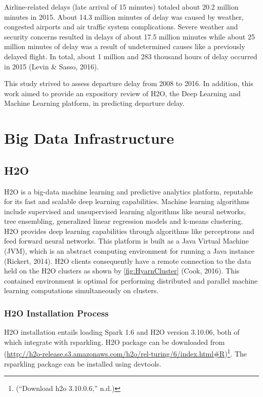 \documentclass[12pt,twoside]{amherstthesis}
\begin{document}
  Airline-related delays (late arrival of 15 minutes) totaled about 20.2
  million minutes in 2015. About 14.3 million minutes of delay was caused
  by weather, congested airports and air traffic system complications.
  Severe weather and security concerns resulted in delays of about 17.5
  million minutes while about 25 million minutes of delay was a result of
  undetermined causes like a previously delayed flight. In total, about 1
  million and 283 thousand hours of delay occurred in 2015 (Levin \&
  Sasso, 2016).
  
  This study strived to assess departure delay from 2008 to 2016. In
  addition, this work aimed to provide an expository review of H2O, the
  Deep Learning and Machine Learning platform, in predicting departure
  delay.
  
  \chapter{Big Data Infrastructure}\label{big-data-infrastructure}
  
  \section{H2O}\label{h2o}
  
  H2O is a big-data machine learning and predictive analytics platform,
  reputable for its fast and scalable deep learning capabilities. Machine
  learning algorithms include supervised and unsupervised learning
  algorithms like neural networks, tree ensembling, generalized linear
  regression models and k-means clustering. H2O provides deep learning
  capabilities through algorithms like perceptrons and feed forward neural
  networks. This platform is built as a Java Virtual Machine (JVM), which
  is an abstract computing environment for running a Java instance
  (Rickert, 2014). H2O clients consequently have a remote connection to
  the data held on the H2O clusters as shown by \autoref{fig:HyarnCluster}
  (Cook, 2016). This contained environment is optimal for performing
  distributed and parallel machine learning computations simultaneously on
  clusters.
  
  \subsection{H2O Installation Process}\label{h2o-installation-process}
  
  H2O installation entails loading Spark 1.6 and H2O version 3.10.06, both
  of which integrate with rsparkling. H2O package can be downloaded from
  (\url{http://h2o-release.s3.amazonaws.com/h2o/rel-turing/6/index.html\#R})\footnote{(``Download
    h2o 3.10.0.6,'' n.d.)}. The rsparkling package can be installed using
  devtools.
  
\end{document}
